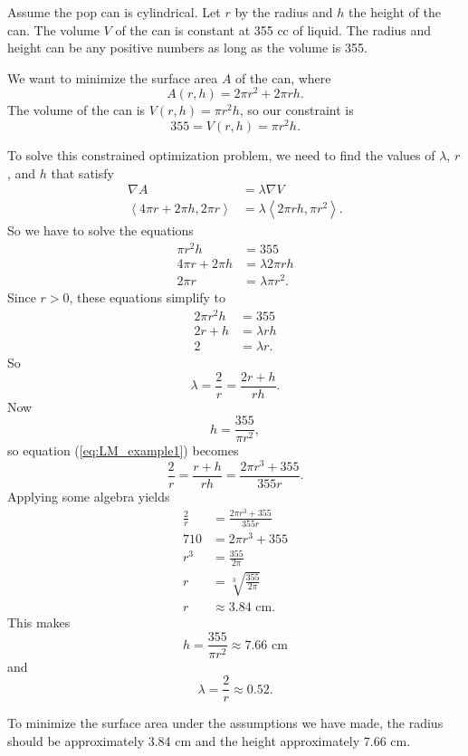 \begin{activitySolution}
\ba
\item Assume the pop can is cylindrical. Let $r$ by the radius and $h$ the height of the can. The volume $V$ of the can is constant at 355 cc of liquid. The radius and height can be any positive numbers as long as the volume is 355.

\item We want to minimize the surface area $A$ of the can, where
\[A(r,h) = 2\pi r^2 + 2\pi r h.\]
The volume of the can is $V(r,h) = \pi r^2 h$, so our constraint is
\[355 = V(r,h) = \pi r^2 h.\]

\item To solve this constrained optimization problem, we need to find the values of $\lambda$, $r$, and $h$ that satisfy
\begin{align*}
\nabla A &= \lambda \nabla V \\
\left\langle 4\pi r + 2\pi h, 2 \pi r \right\rangle &= \lambda \left\langle 2\pi rh, \pi r^2 \right\rangle.
\end{align*}
So we have to solve the equations
\begin{align*}
\pi r^2h &= 355 \\
4\pi r + 2\pi h &= \lambda 2\pi rh \\
2 \pi r &= \lambda \pi r^2.
\end{align*}
Since $r>0$, these equations simplify to
\begin{align*}
2\pi r^2h &= 355 \\
2r + h &= \lambda rh \\
2 &= \lambda r.
\end{align*}
So
\begin{equation} \label{eq:LM_example1}
\lambda = \frac{2}{r} = \frac{2r+h}{rh}.
\end{equation}
Now
\[h = \frac{355}{\pi r^2},\]
so equation (\ref{eq:LM_example1}) becomes
\[\frac{2}{r} = \frac{r+h}{rh} = \frac{2\pi r^3+355}{355r}.\]
Applying some algebra yields
\begin{align*}
\frac{2}{r} &= \frac{2\pi r^3+355}{355r} \\
710 &= 2\pi r^3 + 355 \\
r^3 &= \frac{355}{2\pi} \\
r &= \sqrt[3]{\frac{355}{2\pi}} \\
r &\approx 3.84 \text{ cm}.
\end{align*}
This makes
\[h = \frac{355}{\pi r^2} \approx 7.66 \text{ cm}\]
and
\[\lambda = \frac{2}{r} \approx 0.52.\]

\item To minimize the surface area under the assumptions we have made, the radius should be approximately 3.84 cm and the height approximately 7.66 cm.

\ea

\end{activitySolution}
\aftera